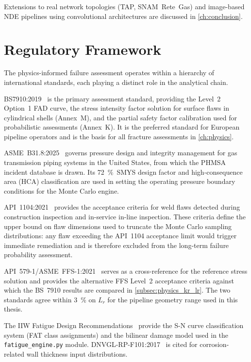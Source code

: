 Extensions to real network topologies (TAP, SNAM~Rete~Gas) and image-based
NDE pipelines using convolutional architectures are discussed in
\cref{ch:conclusion}.

\section{Regulatory Framework}
\label{sec:intro_regulatory}

The physics-informed failure assessment operates within a hierarchy of
international standards, each playing a distinct role in the analytical
chain.

\ac{BS7910}:2019~\cite{BS7910:2019} is the primary assessment standard,
providing the Level~2 Option~1 \ac{FAD} curve, the stress intensity
factor solution for surface flaws in cylindrical shells (Annex~M), and
the partial safety factor calibration used for probabilistic assessments
(Annex~K).  It is the preferred standard for European pipeline operators
and is the basis for all fracture assessments in \cref{ch:physics}.

\acs{ASME}~B31.8:2025~\cite{ASME_B31_8:2025} governs pressure design
and integrity management for gas transmission piping systems in the
United States, from which the \acs{PHMSA} incident database is drawn.
Its \SI{72}{\percent}~\acs{SMYS} design factor and high-consequence area
(HCA) classification are used in setting the operating pressure boundary
conditions for the Monte Carlo engine.

\acs{API}~1104:2021~\cite{API1104:2021} provides the acceptance criteria
for weld flaws detected during construction inspection and in-service
in-line inspection.  These criteria define the upper bound on flaw
dimensions used to truncate the Monte Carlo sampling distributions:
any flaw exceeding the API~1104 acceptance limit would trigger
immediate remediation and is therefore excluded from the long-term
failure probability assessment.

\acs{API}~579-1/\acs{ASME}~FFS-1:2021~\cite{API579:2021} serves as a
cross-reference for the reference stress solution and provides the
alternative FFS Level~2 acceptance criteria against which the
BS~7910 results are compared in \cref{subsec:physics_kr_lr}.  The
two standards agree within \SI{3}{\percent} on $L_r$ for the pipeline
geometry range used in this thesis.

The \acs{IIW} Fatigue Design Recommendations~\cite{IIW_Fatigue:2016}
provide the S-N curve classification system (FAT class assignments)
and the bilinear damage model used in the \texttt{fatigue\_engine.py}
module.  DNVGL-RP-F101:2017~\cite{DNVGL_RPF101:2017} is cited for
corrosion-related wall thickness input distributions.

